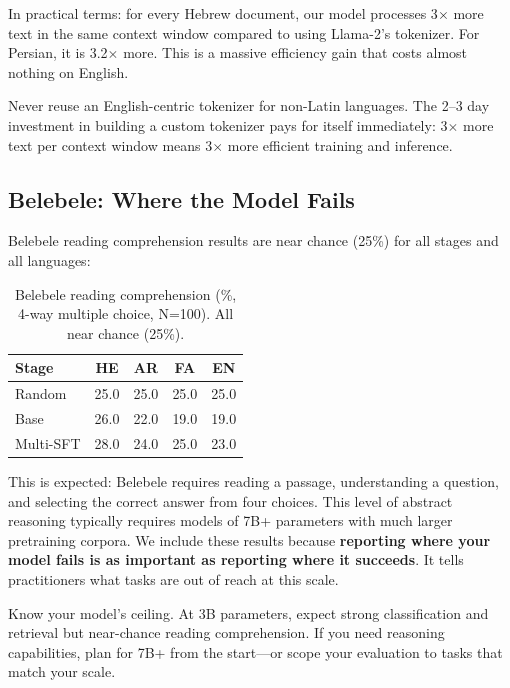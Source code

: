 \documentclass[11pt,a4paper]{article}
\begin{document}
In practical terms: for every Hebrew document, our model processes 3$\times$ more text in the same context window compared to using Llama-2's tokenizer. For Persian, it is 3.2$\times$ more. This is a massive efficiency gain that costs almost nothing on English.

\begin{tip}[title={Builder Takeaway}]
Never reuse an English-centric tokenizer for non-Latin languages. The 2--3 day investment in building a custom tokenizer pays for itself immediately: 3$\times$ more text per context window means 3$\times$ more efficient training and inference.
\end{tip}

\subsection{Belebele: Where the Model Fails}

Belebele reading comprehension results are near chance (25\%) for all stages and all languages:

\begin{table}[H]
\centering
\begin{tabular}{lcccc}
\toprule
\textbf{Stage} & \textbf{HE} & \textbf{AR} & \textbf{FA} & \textbf{EN} \\
\midrule
Random & 25.0 & 25.0 & 25.0 & 25.0 \\
Base & 26.0 & 22.0 & 19.0 & 19.0 \\
Multi-SFT & 28.0 & 24.0 & 25.0 & 23.0 \\
\bottomrule
\end{tabular}
\caption{Belebele reading comprehension (\%, 4-way multiple choice, N=100). All near chance (25\%).}
\label{tab:results_belebele}
\end{table}

This is expected: Belebele requires reading a passage, understanding a question, and selecting the correct answer from four choices. This level of abstract reasoning typically requires models of 7B+ parameters with much larger pretraining corpora. We include these results because \textbf{reporting where your model fails is as important as reporting where it succeeds}. It tells practitioners what tasks are out of reach at this scale.

\begin{tip}[title={Builder Takeaway}]
Know your model's ceiling. At 3B parameters, expect strong classification and retrieval but near-chance reading comprehension. If you need reasoning capabilities, plan for 7B+ from the start---or scope your evaluation to tasks that match your scale.
\end{tip}
\end{document}
